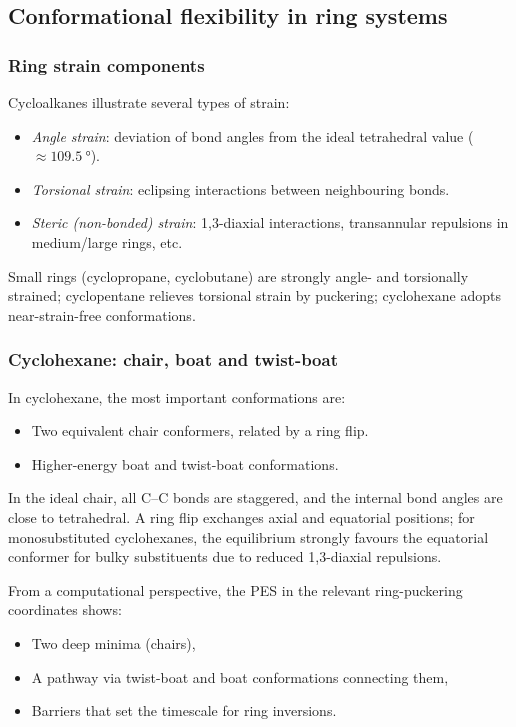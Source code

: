 \documentclass[12pt]{article}
\begin{document}
\subsection{Conformational flexibility in ring systems}

\subsubsection{Ring strain components}

Cycloalkanes illustrate several types of strain:
\begin{itemize}
 \item \textit{Angle strain}: deviation of bond angles from the ideal tetrahedral value (\(\approx\SI{109.5}{\degree}\)).
    \item \textit{Torsional strain}: eclipsing interactions between neighbouring bonds.
    \item \textit{Steric (non-bonded) strain}: 1,3-diaxial interactions, transannular repulsions in medium/large rings, etc.
\end{itemize}
Small rings (cyclopropane, cyclobutane) are strongly angle- and torsionally strained; cyclopentane relieves torsional strain by puckering; cyclohexane adopts near-strain-free conformations.

\subsubsection{Cyclohexane: chair, boat and twist-boat}

In cyclohexane, the most important conformations are:
\begin{itemize}
\item Two equivalent chair conformers, related by a ring flip.
\item Higher-energy boat and twist-boat conformations.
\end{itemize}

In the ideal chair, all C–C bonds are staggered, and the internal bond angles are close to tetrahedral. A ring flip exchanges axial and equatorial positions; for monosubstituted cyclohexanes, the equilibrium strongly favours the equatorial conformer for bulky substituents due to reduced 1,3-diaxial repulsions.

From a computational perspective, the PES in the relevant ring-puckering coordinates shows:
\begin{itemize}
\item Two deep minima (chairs),
\item A pathway via twist-boat and boat conformations connecting them,
\item Barriers that set the timescale for ring inversions.
\end{itemize}
\end{document}
